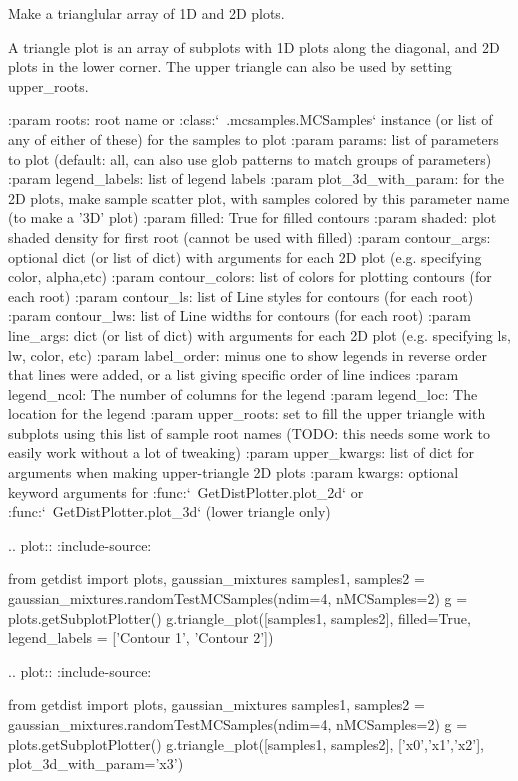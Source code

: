 \begin{DoxyVerb}Make a trianglular array of 1D and 2D plots. 

A triangle plot is an array of subplots with 1D plots along the diagonal, and 2D plots in the lower corner.
The upper triangle can also be used by setting upper_roots.

:param roots: root name or :class:`~.mcsamples.MCSamples` instance (or list of any of either of these) for the samples to plot
:param params: list of parameters to plot (default: all, can also use glob patterns to match groups of parameters)
:param legend_labels: list of legend labels
:param plot_3d_with_param: for the 2D plots, make sample scatter plot, with samples colored by this parameter name (to make a '3D' plot)
:param filled: True for filled contours
:param shaded: plot shaded density for first root (cannot be used with filled)
:param contour_args: optional dict (or list of dict) with arguments for each 2D plot (e.g. specifying color, alpha,etc)
:param contour_colors: list of colors for plotting contours (for each root)
:param contour_ls: list of Line styles for contours (for each root)
:param contour_lws: list of Line widths for contours (for each root)
:param line_args: dict (or list of dict) with arguments for each 2D plot (e.g. specifying ls, lw, color, etc)
:param label_order: minus one to show legends in reverse order that lines were added, or a list giving specific order of line indices 
:param legend_ncol: The number of columns for the legend
:param legend_loc: The location for the legend
:param upper_roots: set to fill the upper triangle with subplots using this list of sample root names 
             (TODO: this needs some work to easily work without a lot of tweaking)
:param upper_kwargs: list of dict for arguments when making upper-triangle 2D plots
:param kwargs: optional keyword arguments for :func:`~GetDistPlotter.plot_2d` or :func:`~GetDistPlotter.plot_3d` (lower triangle only)

.. plot::
   :include-source: 

    from getdist import plots, gaussian_mixtures
    samples1, samples2 = gaussian_mixtures.randomTestMCSamples(ndim=4, nMCSamples=2)
    g = plots.getSubplotPlotter()
    g.triangle_plot([samples1, samples2], filled=True, legend_labels = ['Contour 1', 'Contour 2'])

.. plot::
   :include-source: 

    from getdist import plots, gaussian_mixtures
    samples1, samples2 = gaussian_mixtures.randomTestMCSamples(ndim=4, nMCSamples=2)
    g = plots.getSubplotPlotter()
    g.triangle_plot([samples1, samples2], ['x0','x1','x2'], plot_3d_with_param='x3')\end{DoxyVerb}
 

